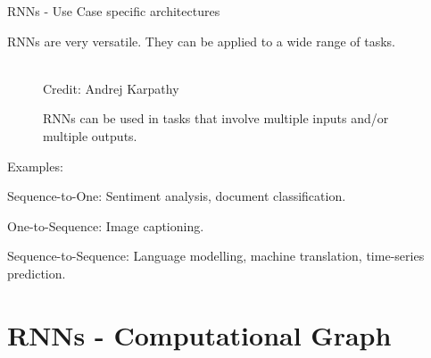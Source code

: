 \begin{frame} {RNNs - Use Case specific architectures}

  \small{RNNs are very versatile. They can be applied to a wide range of tasks.
  
  \begin{figure}
      \centering
      \tiny{\\Credit: Andrej Karpathy}
      \caption{\footnotesize {RNNs can be used in tasks that involve multiple inputs and/or multiple outputs. }}
  \end{figure}
  Examples:}
  \begin{itemize}
    \item \small{Sequence-to-One: Sentiment analysis, document classification.
    \item One-to-Sequence: Image captioning.
    \item Sequence-to-Sequence: Language modelling, machine translation, time-series prediction.}
  \end{itemize}
\end{frame}



\section{RNNs - Computational Graph}

